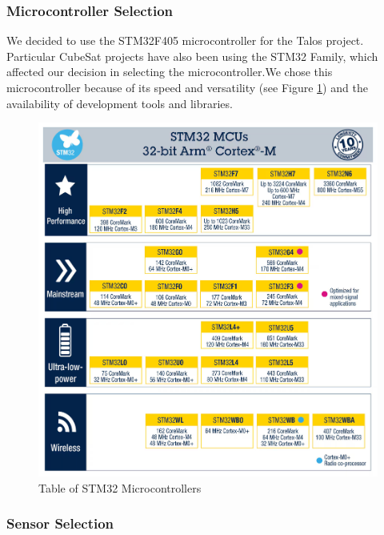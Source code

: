 \documentclass{article}
\begin{document}
\subsubsection{Microcontroller Selection}
\qquad We decided to use the STM32F405 microcontroller for the Talos project. Particular CubeSat projects have also been using the STM32 Family\cite{Yost_2023}, which affected our decision in selecting the microcontroller.We chose this microcontroller because of its speed and versatility (see Figure \ref{fig:microcontrollers}) and the availability of development tools and libraries.
\begin{figure}[p]
      \caption{Table of STM32 Microcontrollers\cite{STM32_Table}}
      \label{fig:microcontrollers}
      \includegraphics[width=\textwidth]{stm_mcu_chart.jpg}
      \centering
\end{figure}

\subsubsection{Sensor Selection}
\end{document}
